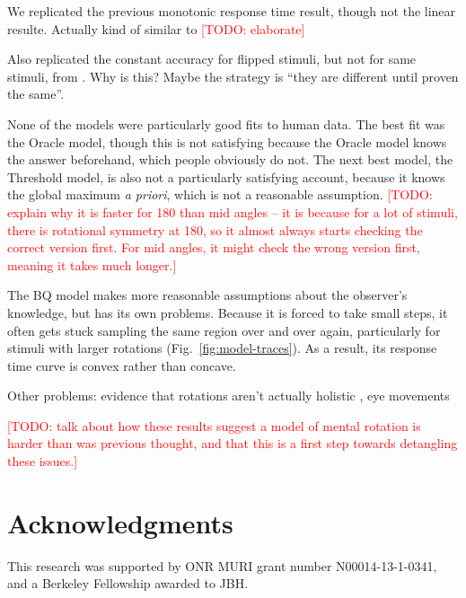 \documentclass[10pt,letterpaper]{article}
\newcommand{\TODO}[1]{\textcolor{red}{[TODO: #1]}}
\newcommand{\Oc}[0]{Oracle}
\newcommand{\Th}[0]{Threshold}
\newcommand{\Bq}[0]{BQ}
\begin{document}
We replicated the previous monotonic response time result, though not
the linear resulte. Actually kind of similar to \cite{Gardony:2013gn}
\TODO{elaborate}

Also replicated the constant accuracy for flipped stimuli, but not for
same stimuli, from \cite{Cooper:1975wp}. Why is this? Maybe the
strategy is ``they are different until proven the same''.

None of the models were particularly good fits to human data. The best
fit was the \Oc{} model, though this is not satisfying because the
\Oc{} model knows the answer beforehand, which people obviously do
not. The next best model, the \Th{} model, is also not a
particularly satisfying account, because it knows the global maximum
\textit{a priori}, which is not a reasonable assumption. \TODO{explain
  why it is faster for 180 than mid angles -- it is because for a lot
  of stimuli, there is rotational symmetry at 180, so it almost always
  starts checking the correct version first. For mid angles, it might
  check the wrong version first, meaning it takes much longer.}

The \Bq{} model makes more reasonable assumptions about the observer's
knowledge, but has its own problems. Because it is forced to take
small steps, it often gets stuck sampling the same region over and
over again, particularly for stimuli with larger rotations
(Fig.~\ref{fig:model-traces}). As a result, its response time curve is
convex rather than concave.

Other problems: evidence that rotations aren't actually holistic
\cite{Yuille:1982tx}, eye movements \cite{Just1976}

\TODO{talk about how these results suggest a model of mental rotation
  is harder than was previous thought, and that this is a first step
  towards detangling these issues.}

\section{Acknowledgments}

This research was supported by ONR MURI grant number N00014-13-1-0341,
and a Berkeley Fellowship awarded to JBH.



\setlength{\bibleftmargin}{.125in}
\setlength{\bibindent}{-\bibleftmargin}


\end{document}
